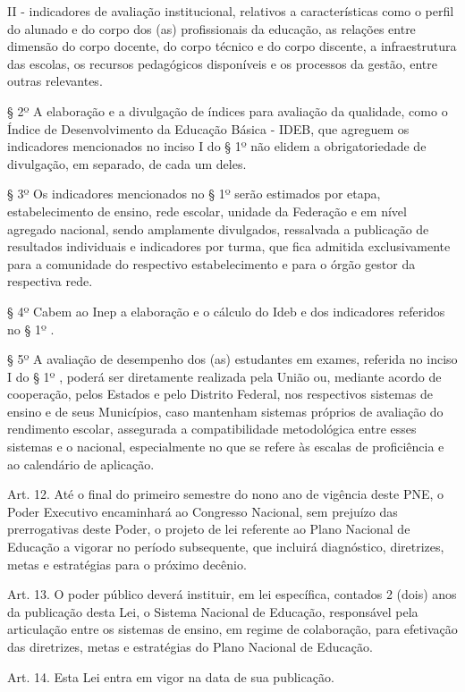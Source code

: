\documentclass[
]{book}
\begin{document}
II - indicadores de avaliação institucional, relativos a características como o perfil do alunado e do corpo dos (as) profissionais da educação, as relações entre dimensão do corpo docente, do corpo técnico e do corpo discente, a infraestrutura das escolas, os recursos pedagógicos disponíveis e os processos da gestão, entre outras relevantes.

§ 2º A elaboração e a divulgação de índices para avaliação da qualidade, como o Índice de Desenvolvimento da Educação Básica - IDEB, que agreguem os indicadores mencionados no inciso I do § 1º não elidem a obrigatoriedade de divulgação, em separado, de cada um deles.

§ 3º Os indicadores mencionados no § 1º serão estimados por etapa, estabelecimento de ensino, rede escolar, unidade da Federação e em nível agregado nacional, sendo amplamente divulgados, ressalvada a publicação de resultados individuais e indicadores por turma, que fica admitida exclusivamente para a comunidade do respectivo estabelecimento e para o órgão gestor da respectiva rede.

§ 4º Cabem ao Inep a elaboração e o cálculo do Ideb e dos indicadores referidos no § 1º .

§ 5º A avaliação de desempenho dos (as) estudantes em exames, referida no inciso I do § 1º , poderá ser diretamente realizada pela União ou, mediante acordo de cooperação, pelos Estados e pelo Distrito Federal, nos respectivos sistemas de ensino e de seus Municípios, caso mantenham sistemas próprios de avaliação do rendimento escolar, assegurada a compatibilidade metodológica entre esses sistemas e o nacional, especialmente no que se refere às escalas de proficiência e ao calendário de aplicação.

Art. 12. Até o final do primeiro semestre do nono ano de vigência deste PNE, o Poder Executivo encaminhará ao Congresso Nacional, sem prejuízo das prerrogativas deste Poder, o projeto de lei referente ao Plano Nacional de Educação a vigorar no período subsequente, que incluirá diagnóstico, diretrizes, metas e estratégias para o próximo decênio.

Art. 13. O poder público deverá instituir, em lei específica, contados 2 (dois) anos da publicação desta Lei, o Sistema Nacional de Educação, responsável pela articulação entre os sistemas de ensino, em regime de colaboração, para efetivação das diretrizes, metas e estratégias do Plano Nacional de Educação.

Art. 14. Esta Lei entra em vigor na data de sua publicação.
\end{document}
